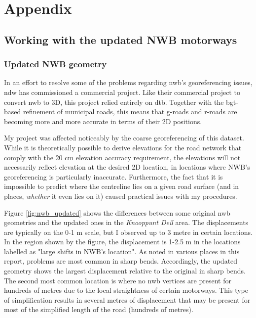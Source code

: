 
\chapter{Appendix}
\label{chap:app}

\section{Working with the updated NWB motorways}
\label{sec:nwb_updated}

\subsection{Updated NWB geometry}
\label{sub:nwb_updated_geometry}

In an effort to resolve some of the problems regarding \ac{nwb}'s georeferencing issues, \ac{ndw} has commissioned a commercial project. Like their commercial project to convert \ac{nwb} to 3D, this project relied entirely on \ac{dtb}. Together with the \ac{bgt}-based refinement of municipal roads, this means that \ac{g-roads} and \ac{r-roads} are becoming more and more accurate in terms of their 2D positions.

My project was affected noticeably by the coarse georeferencing of this dataset. While it is theoretically possible to derive elevations for the road network that comply with the 20 cm elevation accuracy requirement, the elevations will not necessarily reflect elevation at the desired 2D location, in locations where \ac{NWB}'s georeferencing is particularly inaccurate. Furthermore, the fact that it is impossible to predict where the centreline lies on a given road surface (and in places, \textit{whether} it even lies on it) caused practical issues with my procedures.

Figure \ref{fig:nwb_updated} shows the differences between some original \ac{nwb} geometries and the updated ones in the \textit{Knooppunt Deil} area. The displacements are typically on the 0-1 m scale, but I observed up to 3 metre in certain locations. In the region shown by the figure, the displacement is 1-2.5 m in the locations labelled as "large shifts in NWB's location". As noted in various places in this report, problems are most common in sharp bends. Accordingly, the updated geometry shows the largest displacement relative to the original in sharp bends. The second most common location is where no \ac{nwb} vertices are present for hundreds of metres due to the local straightness of certain motorways. This type of simplification results in several metres of displacement that may be present for most of the simplified length of the road (hundreds of metres).

